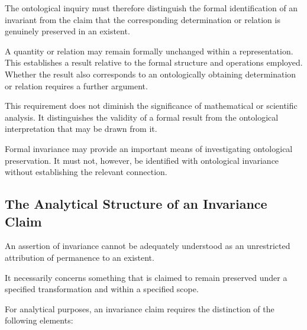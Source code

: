 The ontological inquiry must therefore distinguish the
formal identification of an invariant from the claim that
the corresponding determination or relation is genuinely
preserved in an existent.

A quantity or relation may remain formally unchanged within
a representation. This establishes a result relative to
the formal structure and operations employed. Whether the
result also corresponds to an ontologically obtaining
determination or relation requires a further argument.

This requirement does not diminish the significance of
mathematical or scientific analysis. It distinguishes
the validity of a formal result from the ontological
interpretation that may be drawn from it.

Formal invariance may provide an important means of
investigating ontological preservation. It must not,
however, be identified with ontological invariance
without establishing the relevant connection.

\subsection{The Analytical Structure of an Invariance Claim}

An assertion of invariance cannot be adequately understood
as an unrestricted attribution of permanence to an existent.

It necessarily concerns something that is claimed to remain
preserved under a specified transformation and within
a specified scope.

For analytical purposes, an invariance claim requires
the distinction of the following elements:

